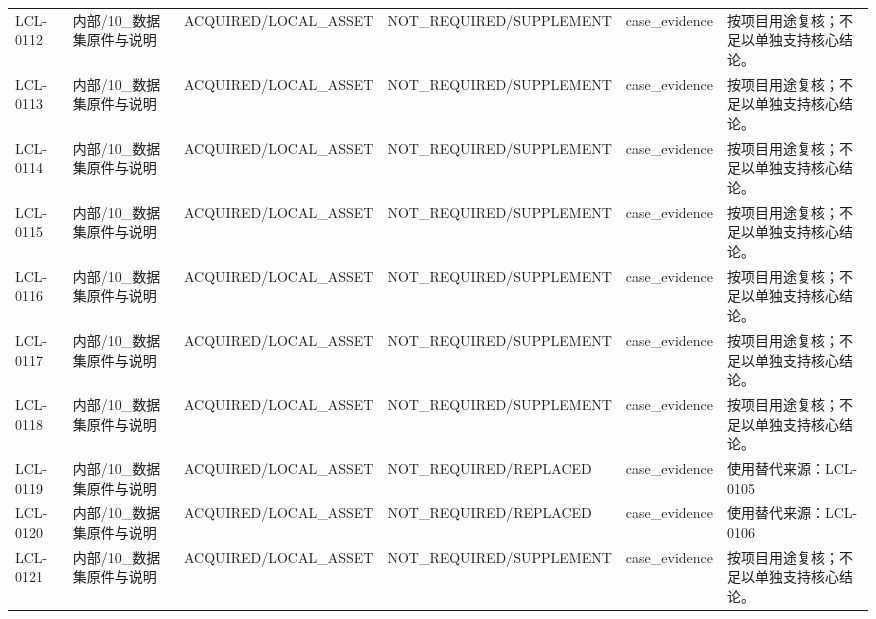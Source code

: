 \begin{landscape}
\begin{longtable}{p{1.8cm}p{2.6cm}p{2.6cm}p{2.6cm}p{4.8cm}p{7.2cm}}
LCL-0112 & 内部/\allowbreak{}10\_\allowbreak{}数据集原件与说明 & ACQUIRED/\allowbreak{}LOCAL\_\allowbreak{}ASSET & NOT\_\allowbreak{}REQUIRED/\allowbreak{}SUPPLEMENT & case\_\allowbreak{}evidence & 按项目用途复核；不足以单独支持核心结论。\\
LCL-0113 & 内部/\allowbreak{}10\_\allowbreak{}数据集原件与说明 & ACQUIRED/\allowbreak{}LOCAL\_\allowbreak{}ASSET & NOT\_\allowbreak{}REQUIRED/\allowbreak{}SUPPLEMENT & case\_\allowbreak{}evidence & 按项目用途复核；不足以单独支持核心结论。\\
LCL-0114 & 内部/\allowbreak{}10\_\allowbreak{}数据集原件与说明 & ACQUIRED/\allowbreak{}LOCAL\_\allowbreak{}ASSET & NOT\_\allowbreak{}REQUIRED/\allowbreak{}SUPPLEMENT & case\_\allowbreak{}evidence & 按项目用途复核；不足以单独支持核心结论。\\
LCL-0115 & 内部/\allowbreak{}10\_\allowbreak{}数据集原件与说明 & ACQUIRED/\allowbreak{}LOCAL\_\allowbreak{}ASSET & NOT\_\allowbreak{}REQUIRED/\allowbreak{}SUPPLEMENT & case\_\allowbreak{}evidence & 按项目用途复核；不足以单独支持核心结论。\\
LCL-0116 & 内部/\allowbreak{}10\_\allowbreak{}数据集原件与说明 & ACQUIRED/\allowbreak{}LOCAL\_\allowbreak{}ASSET & NOT\_\allowbreak{}REQUIRED/\allowbreak{}SUPPLEMENT & case\_\allowbreak{}evidence & 按项目用途复核；不足以单独支持核心结论。\\
LCL-0117 & 内部/\allowbreak{}10\_\allowbreak{}数据集原件与说明 & ACQUIRED/\allowbreak{}LOCAL\_\allowbreak{}ASSET & NOT\_\allowbreak{}REQUIRED/\allowbreak{}SUPPLEMENT & case\_\allowbreak{}evidence & 按项目用途复核；不足以单独支持核心结论。\\
LCL-0118 & 内部/\allowbreak{}10\_\allowbreak{}数据集原件与说明 & ACQUIRED/\allowbreak{}LOCAL\_\allowbreak{}ASSET & NOT\_\allowbreak{}REQUIRED/\allowbreak{}SUPPLEMENT & case\_\allowbreak{}evidence & 按项目用途复核；不足以单独支持核心结论。\\
LCL-0119 & 内部/\allowbreak{}10\_\allowbreak{}数据集原件与说明 & ACQUIRED/\allowbreak{}LOCAL\_\allowbreak{}ASSET & NOT\_\allowbreak{}REQUIRED/\allowbreak{}REPLACED & case\_\allowbreak{}evidence & 使用替代来源：LCL-0105\\
LCL-0120 & 内部/\allowbreak{}10\_\allowbreak{}数据集原件与说明 & ACQUIRED/\allowbreak{}LOCAL\_\allowbreak{}ASSET & NOT\_\allowbreak{}REQUIRED/\allowbreak{}REPLACED & case\_\allowbreak{}evidence & 使用替代来源：LCL-0106\\
LCL-0121 & 内部/\allowbreak{}10\_\allowbreak{}数据集原件与说明 & ACQUIRED/\allowbreak{}LOCAL\_\allowbreak{}ASSET & NOT\_\allowbreak{}REQUIRED/\allowbreak{}SUPPLEMENT & case\_\allowbreak{}evidence & 按项目用途复核；不足以单独支持核心结论。\\

\end{longtable}
\end{landscape}
